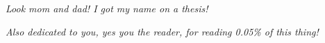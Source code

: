 \thispagestyle{empty}
{}

\vspace*{3cm}

\begin{center}
  \textit{Look mom and dad! I got my name on a thesis!}

  \bigskip \bigskip

  \textit{Also dedicated to you, yes you the reader, for reading 0.05\% of this thing!}
\end{center}